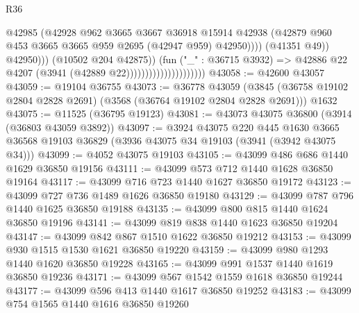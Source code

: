 \begin{lexlean}{R36}
\begin{coremodule}
                                                      @42985
                                                      (@42928
                                                        @962
                                                        @3665
                                                        @3667
                                                        @36918
                                                        @15914
                                                        @42938
                                                        (@42879
                                                          @960
                                                          @453
                                                          @3665
                                                          @3665
                                                          @959
                                                          @2695
                                                          (@42947 @959)
                                                          @42950))))
                                                  (@41351 @49))
                                                @42950)))
                                          (@10502 @204 @42875))
                                        (fun ("_" : @36715 @3932) =>
                                        @42886 @22 @4207 (@3941 (@42889 @22)))))))))))))))))))))
@43058 := @42600 @43057
@43059 := @19104 @36755
@43073 := @36778
    @43059
    (@3845 (@36758 @19102 @2804 @2828 @2691) (@3568 (@36764 @19102 @2804 @2828 @2691)))
    @1632
@43075 := @11525 (@36795 @19123)
@43081 := @43073 @43075 @36800 (@3914 (@36803 @43059 @3892))
@43097 := @3924
    @43075
    @220
    @445
    @1630
    @3665
    @36568
    @19103
    @36829
    (@3936 @43075 @34 @19103 (@3941 (@3942 @43075 @34)))
@43099 := @4052 @43075 @19103
@43105 := @43099 @486 @686 @1440 @1629 @36850 @19156
@43111 := @43099 @573 @712 @1440 @1628 @36850 @19164
@43117 := @43099 @716 @723 @1440 @1627 @36850 @19172
@43123 := @43099 @727 @736 @1489 @1626 @36850 @19180
@43129 := @43099 @787 @796 @1440 @1625 @36850 @19188
@43135 := @43099 @800 @815 @1440 @1624 @36850 @19196
@43141 := @43099 @819 @838 @1440 @1623 @36850 @19204
@43147 := @43099 @842 @867 @1510 @1622 @36850 @19212
@43153 := @43099 @930 @1515 @1530 @1621 @36850 @19220
@43159 := @43099 @980 @1293 @1440 @1620 @36850 @19228
@43165 := @43099 @991 @1537 @1440 @1619 @36850 @19236
@43171 := @43099 @567 @1542 @1559 @1618 @36850 @19244
@43177 := @43099 @596 @413 @1440 @1617 @36850 @19252
@43183 := @43099 @754 @1565 @1440 @1616 @36850 @19260

\end{coremodule}
\end{lexlean}
